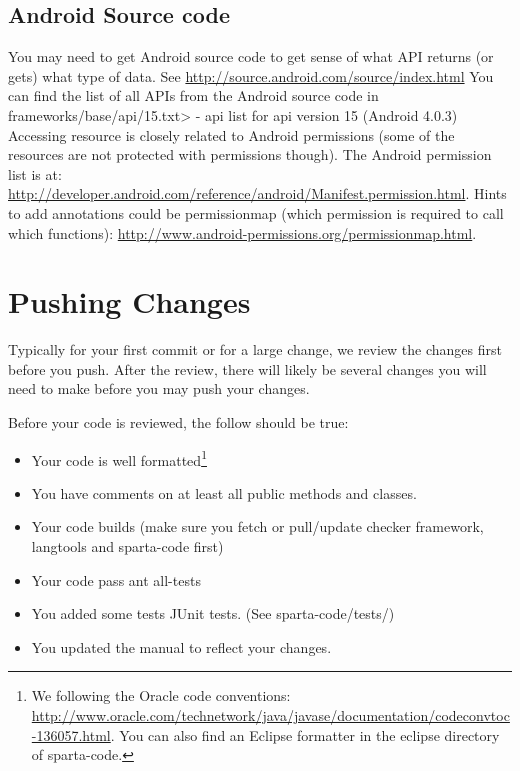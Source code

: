 \subsection{Android Source code\label{sec:android-source-code}}


You may need to get Android source code to get sense of what API returns (or
gets) what type of data. See \url{http://source.android.com/source/index.html}
You can find the list of all APIs from the Android source code in 
\<frameworks/base/api/15.txt> - api list for api version 15 (Android 4.0.3)
Accessing resource is closely related to Android permissions (some of the
resources are not protected with permissions though).
The Android permission list is at:
\url{http://developer.android.com/reference/android/Manifest.permission.html}.
Hints to add annotations could be permissionmap (which permission is required
to call which functions):
\url{http://www.android-permissions.org/permissionmap.html}.

\section{Pushing Changes \label{pushing-changes}}

Typically for your first commit or for a large change, we review the changes first before you push.  After the review, there will likely be several changes you will need to make before you may push your changes.  

Before your code is reviewed, the follow should be true:

  \begin{itemize}
\item Your code is well formatted\footnote{ We following the Oracle code conventions: \url{http://www.oracle.com/technetwork/java/javase/documentation/codeconvtoc-136057.html}. You can also find an Eclipse formatter in the eclipse directory of sparta-code.}
\item You have comments on at least all public methods and classes.
\item Your code builds (make sure you fetch or pull/update checker framework, langtools and sparta-code first)
\item Your code pass ant all-tests
\item You added some tests JUnit tests.  (See sparta-code/tests/)
\item You updated the manual to reflect your changes. 
  \end{itemize}

